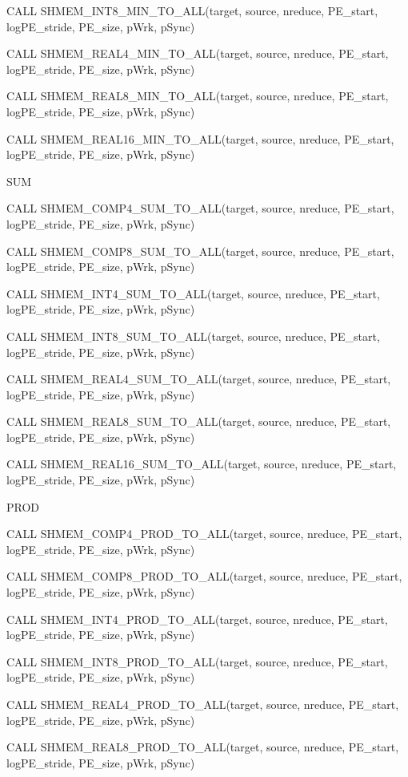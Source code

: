 	  CALL	SHMEM_INT8_MIN_TO_ALL(target,	source,	  nreduce,   PE_start,
	  logPE_stride, PE_size, pWrk, pSync)

	  CALL	 SHMEM_REAL4_MIN_TO_ALL(target,	  source,  nreduce,  PE_start,
	  logPE_stride, PE_size, pWrk, pSync)

	  CALL	SHMEM_REAL8_MIN_TO_ALL(target,	source,	  nreduce,   PE_start,
	  logPE_stride, PE_size, pWrk, pSync)

	  CALL	 SHMEM_REAL16_MIN_TO_ALL(target,  source,  nreduce,  PE_start,
	  logPE_stride, PE_size, pWrk, pSync)
	  
	  SUM
	  
	  CALL	 SHMEM_COMP4_SUM_TO_ALL(target,	  source,  nreduce,  PE_start,
	  logPE_stride, PE_size, pWrk, pSync)

	  CALL	SHMEM_COMP8_SUM_TO_ALL(target,	source,	  nreduce,   PE_start,
	  logPE_stride, PE_size, pWrk, pSync)

	  CALL	 SHMEM_INT4_SUM_TO_ALL(target,	 source,   nreduce,  PE_start,
	  logPE_stride, PE_size, pWrk, pSync)

	  CALL	SHMEM_INT8_SUM_TO_ALL(target,	source,	  nreduce,   PE_start,
	  logPE_stride, PE_size, pWrk, pSync)

	  CALL	 SHMEM_REAL4_SUM_TO_ALL(target,	  source,  nreduce,  PE_start,
	  logPE_stride, PE_size, pWrk, pSync)

	  CALL	SHMEM_REAL8_SUM_TO_ALL(target,	source,	  nreduce,   PE_start,
	  logPE_stride, PE_size, pWrk, pSync)

	  CALL	 SHMEM_REAL16_SUM_TO_ALL(target,  source,  nreduce,  PE_start,
	  logPE_stride, PE_size, pWrk, pSync)
	  
	  PROD
	  
	  CALL	 SHMEM_COMP4_PROD_TO_ALL(target,  source,  nreduce,  PE_start,
	  logPE_stride, PE_size, pWrk, pSync)

	  CALL	SHMEM_COMP8_PROD_TO_ALL(target,	 source,  nreduce,   PE_start,
	  logPE_stride, PE_size, pWrk, pSync)

	  CALL	 SHMEM_INT4_PROD_TO_ALL(target,	  source,  nreduce,  PE_start,
	  logPE_stride, PE_size, pWrk, pSync)

	  CALL	SHMEM_INT8_PROD_TO_ALL(target,	source,	  nreduce,   PE_start,
	  logPE_stride, PE_size, pWrk, pSync)

	  CALL	 SHMEM_REAL4_PROD_TO_ALL(target,  source,  nreduce,  PE_start,
	  logPE_stride, PE_size, pWrk, pSync)

	  CALL	SHMEM_REAL8_PROD_TO_ALL(target,	 source,  nreduce,   PE_start,
	  logPE_stride, PE_size, pWrk, pSync)

